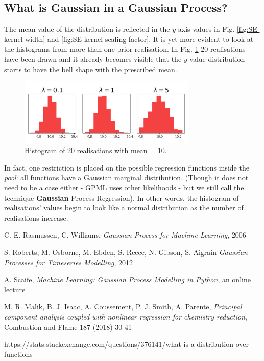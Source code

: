 \documentclass[10pt,twocolumn]{article}
\begin{document}
\subsection{What is Gaussian in a Gaussian Process?}

The mean value of the distribution is reflected in the $y$-axis values in Fig. \ref{fig:SE-kernel-width} and \ref{fig:SE-kernel-scaling-factor}. It is yet more evident to look at the histograms from more than one prior realisation. In Fig. \ref{fig:realisation-histogram} 20 realisations have been drawn and it already becomes visible that the $y$-value distribution starts to have the bell shape with the prescribed mean.


\begin{figure}[H]
\centering\includegraphics[width=8.5cm]{realisation-Histogram-tex.png}
\caption{Histogram of 20 realisations with mean = 10.}
\label{fig:realisation-histogram}
\end{figure}


In fact, one restriction is placed on the possible regression functions inside the
\textit{pool}: all functions have a Gaussian marginal distribution. (Though it does not need to be a case either - GPML uses other likelihoods - but we still call the technique \textbf{Gaussian} Process Regression). In other words, the histogram of realisations' values begin to look like a normal distribution as the number of realisations increase.















\thebibliography{}

 C. E. Rasmussen, C. Williams, \textit{Gaussian Process for Machine Learning}, 2006

 S. Roberts, M. Osborne, M. Ebden, S. Reece, N. Gibson, S. Aigrain \textit{Gaussian Processes for Timeseries Modelling}, 2012

 A. Scaife, \textit{Machine Learning: Gaussian Process Modelling in Python}, an online lecture

 M. R. Malik, B. J. Isaac, A. Coussement, P. J. Smith, A. Parente, \textit{Principal component analysis coupled with nonlinear regression for chemistry reduction}, Combustion and Flame 187 (2018) 30-41

 https://stats.stackexchange.com/questions/376141/what-is-a-distribution-over-functions
\end{document}
